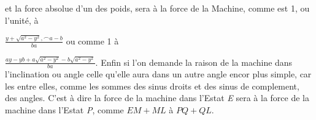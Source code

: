 \pend
\vspace{1mm}
\pstart\noindent%
et la force absolue\protect{} d'un des poids\protect{},
sera \`{a} la force de la Machine\protect{}, comme est 1, ou l'unit\'{e}, \`{a} \rule[-4mm]{0mm}{12mm}$\displaystyle \frac{y + \sqrt{a^2 - y^2}, \smallfrown a - b}{ba}$ ou comme 1 \`{a} \rule[-4mm]{0mm}{12mm}$\displaystyle \frac{ay - yb + a\sqrt{a^2 - y^2} - b\sqrt{a^2 - y^2}}{ba}$. Enfin si l'on demande la raison de la  machine dans l'inclination ou angle  celle qu'elle aura dans un autre angle  encor plus simple, car les  entre elles, comme les sommes des sinus droits et des sinus de complement, des angles. C'est \`{a} dire la force de la machine dans l'Estat \textit{E} sera \`{a} la force de la machine\protect{} dans l'Estat \textit{P}, comme $EM + ML$ \`{a} $PQ + QL$.
\pend